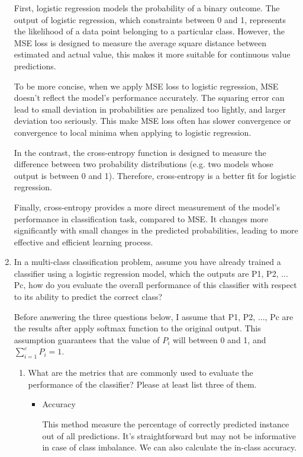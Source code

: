 \documentclass[twocolumn]{extarticle}
\begin{document}
\begin{enumerate}
First, logistic regression models the probability of a binary outcome. The output of logistic regression, which constraints between 0 and 1, represents the likelihood of a data point belonging to a particular class. However, the MSE loss is designed to measure the average square distance between estimated and actual value, this makes it more suitable for continuous value predictions.

To be more concise, when we apply MSE loss to logistic regression, MSE doesn't reflect the model's performance accurately. The squaring error can lead to small deviation in probabilities are penalized too lightly, and larger deviation too seriously. This make MSE loss often has slower convergence or convergence to local minima when applying to logistic regression.

In the contrast, the cross-entropy function is designed to measure the difference between two probability distributions (e.g. two models whose output is between 0 and 1). Therefore, cross-entropy is a better fit for logistic regression.

Finally, cross-entropy provides a more direct measurement of the model's performance in classification task, compared to MSE. It changes more significantly with small changes in the predicted probabilities, leading to more effective and efficient learning process.



\item In a multi-class classification problem, assume you have already trained a classifier using a logistic regression model, which the outputs are P1, P2, ... Pc, how do you evaluate the overall performance of this classifier with respect to its ability to predict the correct class?

Before answering the three questions below, I assume that P1, P2, ..., Pc are the results after apply softmax function to the original output. This assumption guarantees that the value of $P_{i}$ will between 0 and 1, and $\sum_{i=1}^{c} P_{i} = 1$.

\begin{enumerate}
\item What are the metrics that are commonly used to evaluate the performance of the classifier? Please at least list three of them.

\begin{itemize}
\item Accuracy

This method measure the percentage of correctly predicted instance out of all predictions. It's straightforward but may not be informative in case of class imbalance. We can also calculate the in-class accuracy.


\end{itemize}
\end{enumerate}
\end{enumerate}
\end{document}
